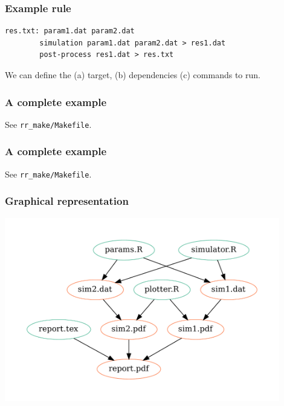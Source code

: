 \documentclass[]{beamer}\usepackage[]{graphicx}\usepackage[]{color}
\begin{document}
\begin{frame}[fragile]
  \frametitle{Example rule}

\begin{verbatim}
res.txt: param1.dat param2.dat
        simulation param1.dat param2.dat > res1.dat
        post-process res1.dat > res.txt
\end{verbatim}

  We can define the (a) target, (b) dependencies (c) commands to run.
  
\end{frame}


\begin{frame}[fragile]
  \frametitle{A complete example}

  \scriptsize
  See \verb+rr_make/Makefile+.
\end{frame}


\begin{frame}[fragile]
  \frametitle{A complete example}

  \scriptsize
  See \verb+rr_make/Makefile+.


\end{frame}

\begin{frame}
  \frametitle{Graphical representation}

  \centering \includegraphics[width=12cm]{graph.pdf}

\end{frame}
\end{document}
